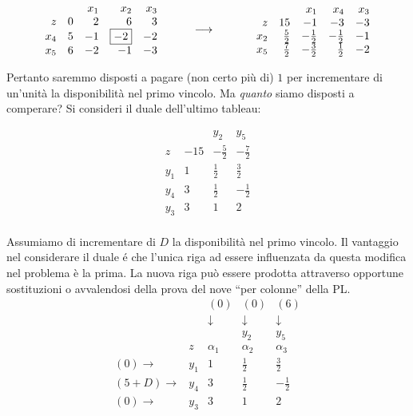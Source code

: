 \documentclass[10pt]{article}
\begin{document}
\[
   \begin{array}{rrrrr}
          & & x_1  & x_2 & x_3  \\
       z  & 0 & 2  & 6 &  3 \\          
      x_4 &  5 &  -1  &  \fbox{$-2$} &  -2 \\
      x_5 &  6 &  -2  &  -1 &  -3 \\
   \end{array}
\hfill
\hspace{1cm}
{\longrightarrow}
\hfill
\hspace{1.2cm}
   \begin{array}{rrrrr}
          & & x_1  & x_4 & x_3  \\
       z  &          15  &           -1  &  -3  & -3 \\          
      x_2 & \frac{5}{2} &  -\frac{1}{2} &  -\frac{1}{2}  & -1 \\
      x_5 & \frac{7}{2} & -\frac{3}{2} &  \frac{1}{2}  & -2 \\
   \end{array}
\]

Pertanto saremmo disposti a pagare (non certo pi\`u di) $1$
per incrementare di un'unit\`a la disponibilit\`a
nel primo vincolo.
Ma {\em quanto} siamo disposti a comperare?
Si consideri il duale dell'ultimo tableau:

\[
   \begin{array}{rrrr}
          & & y_2  & y_5  \\
       z  &  -15 & -\frac{5}{2} & -\frac{7}{2} \\         
      y_1 &  1 & \frac{1}{2} & \frac{3}{2}  \\
      y_4 &  3 &  \frac{1}{2} & -\frac{1}{2} \\
      y_3 &  3 &  1 &  2 \\
   \end{array}
\]

Assumiamo di incrementare di $D$ 
la disponibilit\`a nel primo vincolo.
Il vantaggio nel considerare il duale \'e
che l'unica riga ad essere influenzata da questa
modifica nel problema \`e la prima.
La nuova riga pu\`o essere prodotta 
attraverso opportune sostituzioni o 
avvalendosi della prova del nove ``per colonne'' della PL.\\


\[
   \begin{array}{rrrrr}
       &  & (0) & (0)  & (6) \\
       &  & \downarrow & \downarrow \;& \downarrow \;\\
       &  &  & y_2  & y_5  \\
       & z  &  \alpha_1 & \alpha_2 & \alpha_3 \\     
    (0) \rightarrow & y_1 &  1 & \frac{1}{2} & \frac{3}{2}  \\
    (5+D) \rightarrow & y_4 &  3 &  \frac{1}{2} & -\frac{1}{2} \\
    (0) \rightarrow & y_3 &  3 &  1 &  2 \\
   \end{array}
\]
\end{document}
